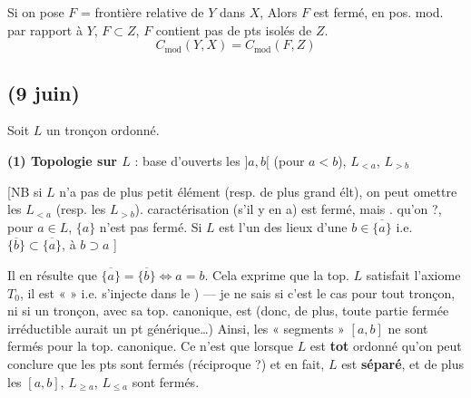 \documentclass[11pt,a4paper]{article}
\begin{document}

Si on pose $F$ = frontière relative de $Y$ dans $X$,  Alors $F$ est fermé,  en pos. mod. par rapport à $Y$,  $F \subset Z$, \struck{\ill{}} \ill{} $F$  \struck{\ill{}} contient pas de pts isolés de $Z$.
\[
  C_{\mathrm{mod}}(Y,X) = C_{\mathrm{mod}}(F, Z)
\]

\subsection{(9 juin)}

Soit $L$ un tronçon ordonné.

\struck{Un sous-ensemble \ill{} dans sous-tronçon fermé de $L$ est un sous-ens. de la forme $[a,$}

\textbf{(1) Topologie sur $L$} : base d'ouverts les $]a,b[$ (pour $a < b$), $L_{<a}$, $L_{>b}$

[NB si $L$ n'a pas de plus petit élément (resp. de plus grand élt), on peut omettre les $L_{<a}$ (resp. les $L_{>b}$).
 caractérisation \ill{}  \ill{} (s'il y en a) est fermé, mais   \ill{}.
\ill{} qu'on  ?, \struck{\ill{}} \struck{\ill{}} pour $a \in L$, $\{a\}$ n'est pas  fermé. Si $L$ est l'un des lieux d'une  \ill{} \ill{}  $b \in \overline{\{a\}}$ i.e. $\overline{\{b\}} \subset \overline{\{a\}}$,  à $b \supset a$ \ill{}]

Il en résulte que $\overline{\{a\}} = \overline{\{b\}} \Leftrightarrow a = b$. Cela exprime que la top. $L$ satisfait l'axiome $T_0$, il est «  » i.e. s'injecte dans le ) — je ne sais si c'est le cas pour tout tronçon, ni si un tronçon, avec sa top. canonique, est  (donc, de plus, toute partie fermée irréductible aurait un pt générique…) Ainsi, les « segments » $[a,b]$ ne sont  fermés pour la top. canonique. Ce n'est que lorsque $L$ est \textbf{tot} ordonné qu'on peut conclure que les pts sont fermés (réciproque ?) et en fait, $L$ est \textbf{séparé}, et de plus les $[a,b]$, $L_{\geq a}$, $L_{\leq a}$ sont fermés.
\end{document}
